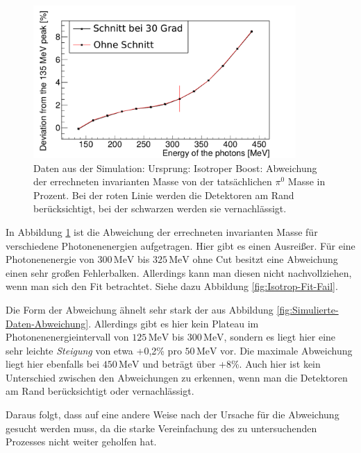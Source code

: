 \documentclass[a4paper,11pt,oneside,final,german,openbib,pdftex]{scrbook}
\begin{document}
{\begin{figure}[h!]
	\begin{center}
		\includegraphics[width=100mm]{20172804IsotropUrpsprungDeviation}
	\end{center}
\caption[Simulation: Isotroper Zerfall Abweichung mit und ohne Detektoren am Rand]{Daten aus der Simulation: Ursprung: Isotroper Boost: Abweichung der errechneten invarianten Masse von der tatsächlichen $\pi^0$ Masse in Prozent. Bei der roten Linie werden die Detektoren am Rand berücksichtigt, bei der schwarzen werden sie vernachlässigt.}
\label{fig:Pi0-Ursprung-Relative-Abweichung}
\end{figure}



In Abbildung \ref{fig:Pi0-Ursprung-Relative-Abweichung} ist die Abweichung der errechneten invarianten Masse für verschiedene Photonenenergien aufgetragen.
Hier gibt es einen Ausrei{\ss}er. F\"ur eine Photonenenergie von $300\,\text{MeV}$ bis $325\,\text{MeV}$ ohne Cut besitzt eine Abweichung einen sehr gro{\ss}en Fehlerbalken. Allerdings kann man diesen nicht nachvollziehen, wenn man sich den Fit betrachtet. Siehe dazu Abbildung \ref{fig:Isotrop-Fit-Fail}.

 Die Form der Abweichung ähnelt sehr stark der aus Abbildung \ref{fig:Simulierte-Daten-Abweichung}.
 Allerdings gibt es hier kein Plateau im Photonenenergieintervall von $125\,\text{MeV}$ bis $300\,\text{MeV}$, sondern es liegt hier eine sehr leichte \textit{Steigung} von etwa +0,2\% pro $50\,\text{MeV}$ vor. Die maximale Abweichung liegt hier ebenfalls bei $450\,\text{MeV}$ und betr\"agt über +8\%. Auch hier ist kein Unterschied zwischen den Abweichungen zu erkennen, wenn man die Detektoren am Rand berücksichtigt oder vernachlässigt. 

Daraus folgt, dass auf eine andere Weise nach der Ursache für die Abweichung gesucht werden muss, da die starke Vereinfachung des zu untersuchenden Prozesses nicht weiter geholfen hat.

}
\end{document}

